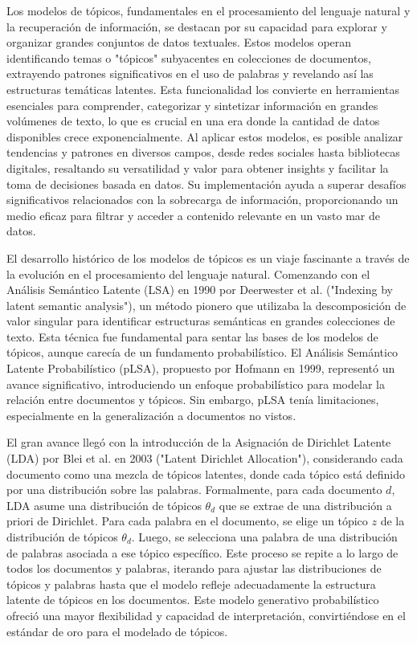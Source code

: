 Los modelos de tópicos, fundamentales en el procesamiento del lenguaje natural y la recuperación de información, se destacan por su capacidad para explorar y organizar grandes conjuntos de datos textuales. Estos modelos operan identificando temas o "tópicos" subyacentes en colecciones de documentos, extrayendo patrones significativos en el uso de palabras y revelando así las estructuras temáticas latentes. Esta funcionalidad los convierte en herramientas esenciales para comprender, categorizar y sintetizar información en grandes volúmenes de texto, lo que es crucial en una era donde la cantidad de datos disponibles crece exponencialmente. Al aplicar estos modelos, es posible analizar tendencias y patrones en diversos campos, desde redes sociales hasta bibliotecas digitales, resaltando su versatilidad y valor para obtener insights y facilitar la toma de decisiones basada en datos. Su implementación ayuda a superar desafíos significativos relacionados con la sobrecarga de información, proporcionando un medio eficaz para filtrar y acceder a contenido relevante en un vasto mar de datos.

El desarrollo histórico de los modelos de tópicos es un viaje fascinante a través de la evolución en el procesamiento del lenguaje natural. Comenzando con el Análisis Semántico Latente (LSA) en 1990 por Deerwester et al. ("Indexing by latent semantic analysis"), un método pionero que utilizaba la descomposición de valor singular para identificar estructuras semánticas en grandes colecciones de texto. Esta técnica fue fundamental para sentar las bases de los modelos de tópicos, aunque carecía de un fundamento probabilístico.
El Análisis Semántico Latente Probabilístico (pLSA), propuesto por Hofmann en 1999, representó un avance significativo, introduciendo un enfoque probabilístico para modelar la relación entre documentos y tópicos. Sin embargo, pLSA tenía limitaciones, especialmente en la generalización a documentos no vistos.

El gran avance llegó con la introducción de la Asignación de Dirichlet Latente (LDA) por Blei et al. en 2003 ("Latent Dirichlet Allocation"), considerando cada documento como una mezcla de tópicos latentes, donde cada tópico está definido por una distribución sobre las palabras. Formalmente,
para cada documento \( d \), LDA asume una distribución de tópicos \( \theta_d \) que se extrae de una distribución a priori de Dirichlet. Para cada palabra en el documento, se elige un tópico \( z \) de la distribución de tópicos \( \theta_d \). Luego, se selecciona una palabra de una distribución de palabras asociada a ese tópico específico.
Este proceso se repite a lo largo de todos los documentos y palabras, iterando para ajustar las distribuciones de tópicos y palabras hasta que el modelo refleje adecuadamente la estructura latente de tópicos en los documentos. Este modelo generativo probabilístico ofreció una mayor flexibilidad y capacidad de interpretación, convirtiéndose en el estándar de oro para el modelado de tópicos.

